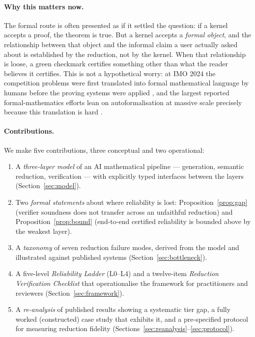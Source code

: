 \documentclass[11pt,a4paper]{article}
\theoremstyle{plain}
\theoremstyle{remark}
\begin{document}
\paragraph{Why this matters now.}
The formal route is often presented as if it settled the question: if a kernel
accepts a proof, the theorem is true.  But a kernel accepts a \emph{formal
object}, and the relationship between that object and the informal claim a user
actually asked about is established by the reduction, not by the kernel.  When
that relationship is loose, a green checkmark certifies something other than
what the reader believes it certifies.  This is not a hypothetical worry: at
IMO 2024 the competition problems were first translated into formal
mathematical language by humans before the proving systems were applied
\cite{hubert2025alphaproof}, and the largest reported formal-mathematics
efforts lean on autoformalisation at massive scale precisely because this
translation is hard \cite{hubert2025alphaproof,azerbayev2023proofnet}.

\paragraph{Contributions.}
We make five contributions, three conceptual and two operational:
\begin{enumerate}[label=(\arabic*),leftmargin=2.2em]
  \item A \emph{three-layer model} of an AI mathematical pipeline ---
        generation, semantic reduction, verification --- with explicitly typed
        interfaces between the layers (Section~\ref{sec:model}).
  \item Two \emph{formal statements} about where reliability is lost:
        Proposition~\ref{prop:gap} (verifier soundness does not transfer across
        an unfaithful reduction) and Proposition~\ref{prop:bound} (end-to-end
        certified reliability is bounded above by the weakest layer).
  \item A \emph{taxonomy} of seven reduction failure modes, derived from the
        model and illustrated against published systems
        (Section~\ref{sec:bottleneck}).
  \item A five-level \emph{Reliability Ladder} (L0--L4) and a twelve-item
        \emph{Reduction Verification Checklist} that operationalise the
        framework for practitioners and reviewers
        (Section~\ref{sec:framework}).
  \item A \emph{re-analysis} of published results showing a systematic tier
        gap, a fully worked (constructed) case study that exhibits it, and a
        pre-specified protocol for measuring reduction fidelity
        (Sections~\ref{sec:reanalysis}--\ref{sec:protocol}).
\end{enumerate}
\end{document}
